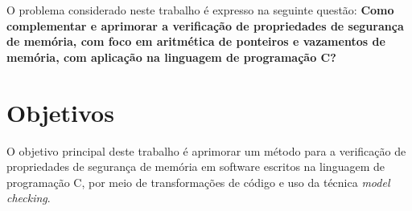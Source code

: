 %

O problema considerado neste trabalho é expresso na seguinte questão:
\textbf{Como complementar e aprimorar a verificação de propriedades de
  segurança de memória, com foco em aritmética de ponteiros e vazamentos de memória, 
  com aplicação na linguagem de programação C?}

  
\section{Objetivos}
O objetivo principal deste trabalho é aprimorar um método para 
a verificação de propriedades de segurança de memória em 
software escritos na linguagem de programação C, por meio 
de transformações de código e uso da técnica \textit{ model checking}. 

